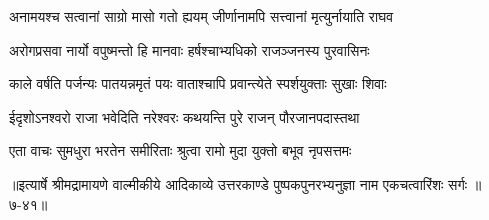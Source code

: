 \twolineshloka
{अनामयश्च सत्वानां साग्रो मासो गतो ह्ययम्}
{जीर्णानामपि सत्त्वानां मृत्युर्नायाति राघव} %

\twolineshloka
{अरोगप्रसवा नार्यो वपुष्मन्तो हि मानवाः}
{हर्षश्चाभ्यधिको राजञ्जनस्य पुरवासिनः} %

\twolineshloka
{काले वर्षति पर्जन्यः पातयन्नमृतं पयः}
{वाताश्चापि प्रवान्त्येते स्पर्शयुक्ताः सुखाः शिवाः} %

\twolineshloka
{ईदृशोऽनश्वरो राजा भवेदिति नरेश्वरः}
{कथयन्ति पुरे राजन् पौरजानपदास्तथा} %

\twolineshloka
{एता वाचः सुमधुरा भरतेन समीरिताः}
{श्रुत्वा रामो मुदा युक्तो बभूव नृपसत्तमः} %


॥इत्यार्षे श्रीमद्रामायणे वाल्मीकीये आदिकाव्ये उत्तरकाण्डे पुष्पकपुनरभ्यनुज्ञा नाम एकचत्वारिंशः सर्गः ॥७-४१॥
